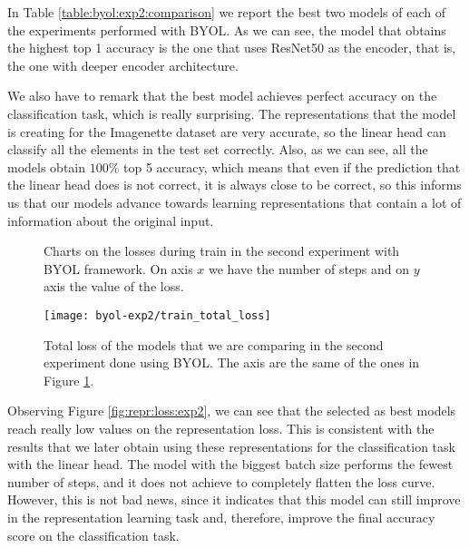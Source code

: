 In Table \ref{table:byol:exp2:comparison} we report the best two models of each of the experiments performed with BYOL. As we can see, the model that obtains the highest top 1 accuracy is the one that uses ResNet50 as the encoder, that is, the one with deeper encoder architecture. 

We also have to remark that the best model achieves perfect accuracy on the classification task, which is really surprising. The representations that the model is creating for the Imagenette dataset are very accurate, so the linear head can classify all the elements in the test set correctly. Also, as we can see, all the models obtain $100\%$ top 5 accuracy, which means that even if the prediction that the linear head does is not correct, it is always close to be correct, so this informs us that our models advance towards learning representations that contain a lot of information about the original input.


\begin{figure}[htp] 
    \centering
    \hfill%
        \caption{Charts on the losses during train in the second experiment with BYOL framework. On axis $x$ we have the number of steps and on $y$ axis the value of the loss.}
        \label{fig:byol:exp2:both:losses}
\end{figure}

\begin{figure}[H]
\centering
\texttt{[image: byol-exp2/train\_total\_loss]}%
\caption{Total loss of the models that we are comparing in the second experiment done using BYOL. The axis are the same of the ones in Figure \ref{fig:byol:exp2:both:losses}. }
\label{fig:byol:total:loss:exp2}%
\end{figure}

Observing Figure \ref{fig:repr:loss:exp2}, we can see that the selected as best models reach really low values on the representation loss. This is consistent with the results that we later obtain using these representations for the classification task with the linear head. The model with the biggest batch size performs the fewest number of steps, and it does not achieve to completely flatten the loss curve. However, this is not bad news, since it indicates that this model can still improve in the representation learning task and, therefore, improve the final accuracy score on the classification task.

